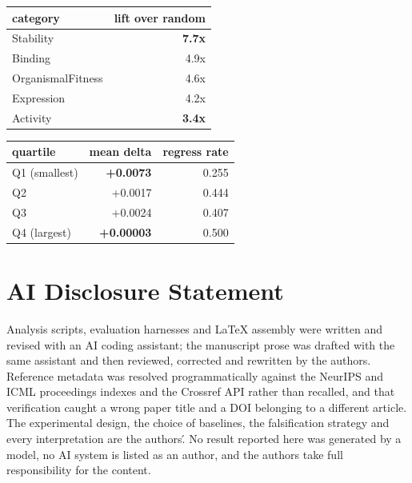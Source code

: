 \documentclass{article}
\begin{document}
\begin{table}[t]
\centering
\small
\begin{tabular}{lr}
\hline
category & lift over random \\
\hline
Stability & \textbf{7.7x} \\
Binding & 4.9x \\
OrganismalFitness & 4.6x \\
Expression & 4.2x \\
Activity & \textbf{3.4x} \\
\hline
\end{tabular}
\end{table}

\begin{table}[t]
\centering
\small
\begin{tabular}{lrr}
\hline
quartile & mean delta & regress rate \\
\hline
Q1 (smallest) & \textbf{+0.0073} & 0.255 \\
Q2 & +0.0017 & 0.444 \\
Q3 & +0.0024 & 0.407 \\
Q4 (largest) & \textbf{+0.00003} & 0.500 \\
\hline
\end{tabular}
\end{table}


\section*{AI Disclosure Statement}

Analysis scripts, evaluation harnesses and \LaTeX{} assembly were written and revised with an AI coding
assistant; the manuscript prose was drafted with the same assistant and then reviewed, corrected and
rewritten by the authors. Reference metadata was resolved programmatically against the NeurIPS and ICML
proceedings indexes and the Crossref API rather than recalled, and that verification caught a wrong
paper title and a DOI belonging to a different article. The experimental design, the choice of baselines,
the falsification strategy and every interpretation are the authors\'. No result reported here was
generated by a model, no AI system is listed as an author, and the authors take full responsibility for
the content.



\end{document}
